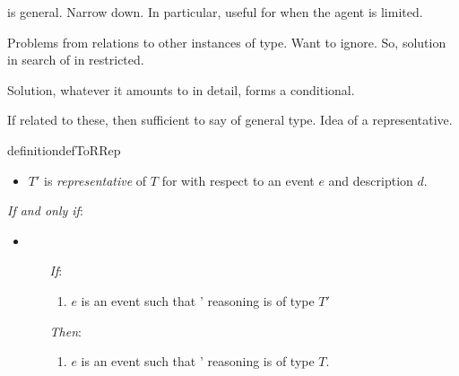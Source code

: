 \begin{note}
  \tor{} is general.
  Narrow down.
  In particular, useful for when the agent is limited.
\end{note}

\begin{note}
  Problems from relations to other instances of type.
  Want to ignore.
  So, solution in search of in restricted.

  Solution, whatever it amounts to in detail, forms a conditional.

  If related to these, then sufficient to say of general type.
  Idea of a representative.
\end{note}

\begin{note}
  \begin{restatable}[\rotor{2}]{definition}{defToRRep}
    \label{def:rotor}

    \begin{itemize}
    \item
      \(T'\) is \emph{representative} of \(T\) for \vAgent{} with respect to an event \(e\) and description \(d\).
    \end{itemize}

    \emph{If and only if}:

    \begin{itemize}
    \item

      \begin{itemize}
      \item[\emph{If}:]
        \begin{enumerate}[label=\alph*., ref=(\alph*), series=tRDef]
        \item
          \(e\) is an event such that \vAgent{}' reasoning is of type \(T'\)
        \end{enumerate}
      \item[\emph{Then}:]
        \begin{enumerate}[label=\alph*., ref=(\alph*), resume*=tRDef]
        \item
          \(e\) is an event such that \vAgent{}' reasoning is of type \(T\).
        \end{enumerate}
      \end{itemize}
    \end{itemize}
    \vspace{-\baselineskip}
  \end{restatable}
\end{note}

